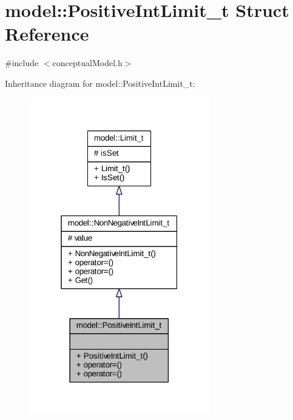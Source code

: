 \hypertarget{structmodel_1_1_positive_int_limit__t}{}\section{model\+:\+:Positive\+Int\+Limit\+\_\+t Struct Reference}
\label{structmodel_1_1_positive_int_limit__t}


{\ttfamily \#include $<$conceptual\+Model.\+h$>$}



Inheritance diagram for model\+:\+:Positive\+Int\+Limit\+\_\+t\+:
\nopagebreak
\begin{figure}[H]
\begin{center}
\leavevmode
\includegraphics[width=223pt]{structmodel_1_1_positive_int_limit__t__inherit__graph}
\end{center}
\end{figure}


